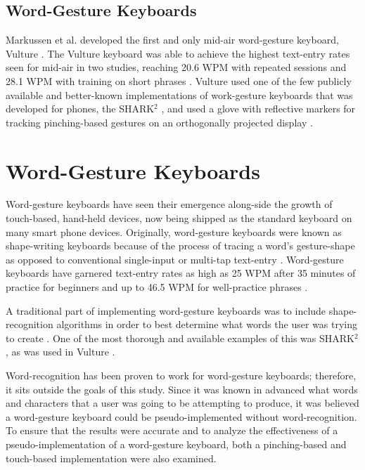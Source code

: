 \subsection{Word-Gesture Keyboards}
Markussen et al. developed the first and only mid-air word-gesture keyboard, Vulture \cite{ref_vulture}. The Vulture keyboard was able to achieve the highest text-entry rates seen for mid-air in two studies, reaching 20.6 WPM with repeated sessions and 28.1 WPM with training on short phrases \cite{ref_vulture}. Vulture used one of the few publicly available and better-known implementations of work-gesture keyboards that was developed for phones, the SHARK$^2$ \cite{ref_shape_writing,ref_shark_wgk}, and used a glove with reflective markers for tracking pinching-based gestures on an orthogonally projected display \cite{ref_selection_based_mid_air}.

\section{Word-Gesture Keyboards}
Word-gesture keyboards have seen their emergence along-side the growth of touch-based, hand-held devices, now being shipped as the standard keyboard on many smart phone devices. Originally, word-gesture keyboards were known as shape-writing keyboards because of the process of tracing a word's gesture-shape as opposed to conventional single-input or multi-tap text-entry \cite{ref_shape_writing,ref_the_word_gesture_keyboard,ref_shapewriter_iphone,ref_shark_wgk,ref_shorthand_writing}. Word-gesture keyboards have garnered text-entry rates as high as 25 WPM after 35 minutes of practice for beginners and up to 46.5 WPM for well-practice phrases \cite{ref_shape_writing}.

A traditional part of implementing word-gesture keyboards was to include shape-recognition algorithms in order to best determine what words the user was trying to create \cite{ref_shape_writing,ref_the_word_gesture_keyboard,ref_shapewriter_iphone,ref_shark_wgk,ref_shorthand_writing}. One of the most thorough and available examples of this was SHARK$^2$ \cite{ref_shape_writing,ref_shark_wgk}, as was used in Vulture \cite{ref_vulture}.

Word-recognition has been proven to work for word-gesture keyboards; therefore, it sits outside the goals of this study. Since it was known in advanced what words and characters that a user was going to be attempting to produce, it was believed a word-gesture keyboard could be pseudo-implemented without word-recognition. To ensure that the results were accurate and to analyze the effectiveness of a pseudo-implementation of a word-gesture keyboard, both a pinching-based and touch-based implementation were also examined.

